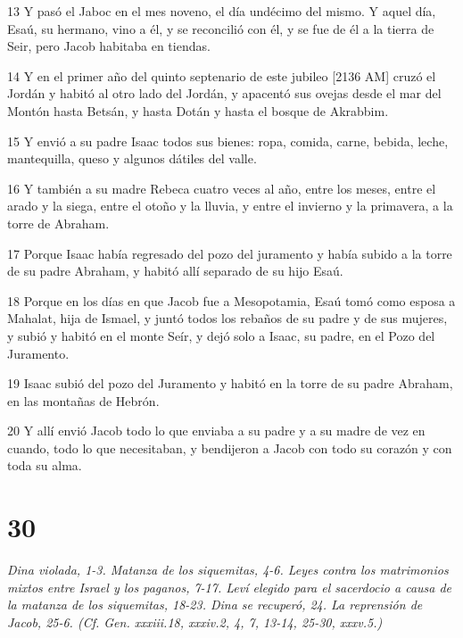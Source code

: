 \par 13 Y pasó el Jaboc en el mes noveno, el día undécimo del mismo. Y aquel día, Esaú, su hermano, vino a él, y se reconcilió con él, y se fue de él a la tierra de Seir, pero Jacob habitaba en tiendas.
\par 14 Y en el primer año del quinto septenario de este jubileo [2136 AM] cruzó el Jordán y habitó al otro lado del Jordán, y apacentó sus ovejas desde el mar del Montón hasta Betsán, y hasta Dotán y hasta el bosque de Akrabbim.
\par 15 Y envió a su padre Isaac todos sus bienes: ropa, comida, carne, bebida, leche, mantequilla, queso y algunos dátiles del valle.
\par 16 Y también a su madre Rebeca cuatro veces al año, entre los meses, entre el arado y la siega, entre el otoño y la lluvia, y entre el invierno y la primavera, a la torre de Abraham.
\par 17 Porque Isaac había regresado del pozo del juramento y había subido a la torre de su padre Abraham, y habitó allí separado de su hijo Esaú.
\par 18 Porque en los días en que Jacob fue a Mesopotamia, Esaú tomó como esposa a Mahalat, hija de Ismael, y juntó todos los rebaños de su padre y de sus mujeres, y subió y habitó en el monte Seír, y dejó solo a Isaac, su padre, en el Pozo del Juramento.
\par 19 Isaac subió del pozo del Juramento y habitó en la torre de su padre Abraham, en las montañas de Hebrón.
\par 20 Y allí envió Jacob todo lo que enviaba a su padre y a su madre de vez en cuando, todo lo que necesitaban, y bendijeron a Jacob con todo su corazón y con toda su alma.

\chapter{30}

\par \textit{Dina violada, 1-3. Matanza de los siquemitas, 4-6. Leyes contra los matrimonios mixtos entre Israel y los paganos, 7-17. Leví elegido para el sacerdocio a causa de la matanza de los siquemitas, 18-23. Dina se recuperó, 24. La reprensión de Jacob, 25-6. (Cf. Gen. xxxiii.18, xxxiv.2, 4, 7, 13-14, 25-30, xxxv.5.)}

